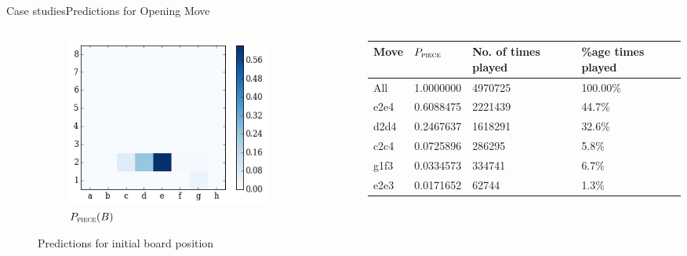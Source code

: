 \documentclass[9pt, unknownkeysallowed]{beamer}
\begin{document}
\begin{frame}{Case studies}{Predictions for Opening Move}
\begin{columns}[c]
\begin{column}{4cm}
\begin{figure}[H]
\begin{subfigure}[t]{\textwidth}
\includegraphics[width=0.9\textwidth]{../img/best_moves/output_12_0.png}
        \caption{$P_{\textsc{piece}}(B)$}
        \label{figure:initialboardb}
    \end{subfigure}
\caption[Predictions for initial board position]{Predictions for initial board 
position}
\end{figure}
\end{column}
\begin{column}{6cm}
 \begin{table}[]
 \tiny
\centering
\begin{tabular}{@{}llll@{}}
\toprule
Move & $P_{\textsc{piece}}$ & No. of times played & \%age times 
played \\ 
\midrule
All  & 1.0000000             & 4970725                & 100.00\%           \\ 
\midrule
e2e4 & 0.6088475             & 2221439                & 44.7\%             \\
d2d4 & 0.2467637             & 1618291                & 32.6\%             \\
c2c4 & 0.0725896             & 286295                 & 5.8\%              \\
g1f3 & 0.0334573             & 334741                 & 6.7\%              \\
e2e3 & 0.0171652             & 62744                  & 1.3\%              \\

\end{tabular}
\end{table}
\end{column}
\end{columns}
\end{frame}
\end{document}
